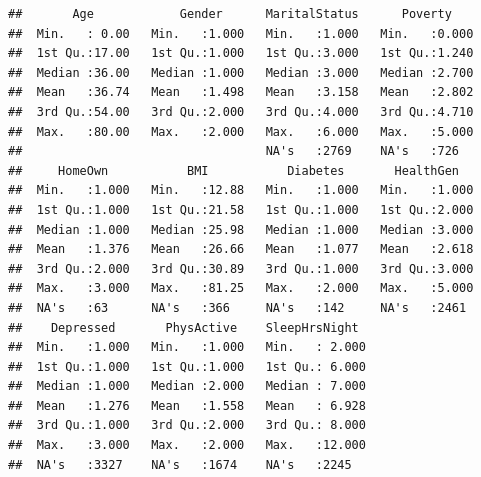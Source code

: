\documentclass[]{article}
\newenvironment{Shaded}{\begin{snugshade}}{\end{snugshade}}
\newcommand{\KeywordTok}[1]{\textcolor[rgb]{0.13,0.29,0.53}{\textbf{{#1}}}}
\newcommand{\StringTok}[1]{\textcolor[rgb]{0.31,0.60,0.02}{{#1}}}
\newcommand{\CommentTok}[1]{\textcolor[rgb]{0.56,0.35,0.01}{\textit{{#1}}}}
\newcommand{\NormalTok}[1]{{#1}}
\begin{document}
\begin{Shaded}
\end{Shaded}

\begin{verbatim}
##       Age            Gender      MaritalStatus      Poverty     
##  Min.   : 0.00   Min.   :1.000   Min.   :1.000   Min.   :0.000  
##  1st Qu.:17.00   1st Qu.:1.000   1st Qu.:3.000   1st Qu.:1.240  
##  Median :36.00   Median :1.000   Median :3.000   Median :2.700  
##  Mean   :36.74   Mean   :1.498   Mean   :3.158   Mean   :2.802  
##  3rd Qu.:54.00   3rd Qu.:2.000   3rd Qu.:4.000   3rd Qu.:4.710  
##  Max.   :80.00   Max.   :2.000   Max.   :6.000   Max.   :5.000  
##                                  NA's   :2769    NA's   :726    
##     HomeOwn           BMI           Diabetes       HealthGen    
##  Min.   :1.000   Min.   :12.88   Min.   :1.000   Min.   :1.000  
##  1st Qu.:1.000   1st Qu.:21.58   1st Qu.:1.000   1st Qu.:2.000  
##  Median :1.000   Median :25.98   Median :1.000   Median :3.000  
##  Mean   :1.376   Mean   :26.66   Mean   :1.077   Mean   :2.618  
##  3rd Qu.:2.000   3rd Qu.:30.89   3rd Qu.:1.000   3rd Qu.:3.000  
##  Max.   :3.000   Max.   :81.25   Max.   :2.000   Max.   :5.000  
##  NA's   :63      NA's   :366     NA's   :142     NA's   :2461   
##    Depressed       PhysActive    SleepHrsNight   
##  Min.   :1.000   Min.   :1.000   Min.   : 2.000  
##  1st Qu.:1.000   1st Qu.:1.000   1st Qu.: 6.000  
##  Median :1.000   Median :2.000   Median : 7.000  
##  Mean   :1.276   Mean   :1.558   Mean   : 6.928  
##  3rd Qu.:1.000   3rd Qu.:2.000   3rd Qu.: 8.000  
##  Max.   :3.000   Max.   :2.000   Max.   :12.000  
##  NA's   :3327    NA's   :1674    NA's   :2245
\end{verbatim}
\end{document}

